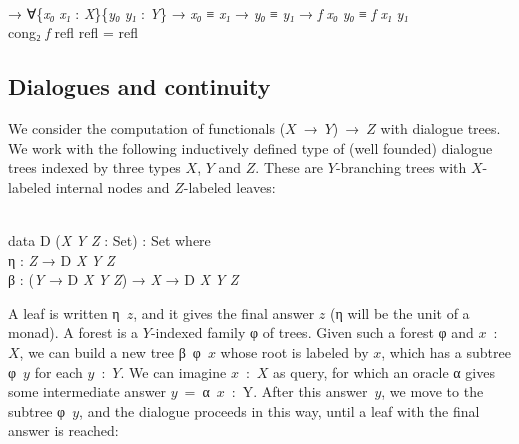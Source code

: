 \documentclass{entcs} \usepackage{prentcsmacro}
\newcommand{\AgdaC}[1]{\mbox{#1}}
\newcommand{\AgdaFontStyle}[1]{\textsf{#1}}
\newcommand{\AgdaBoundFontStyle}[1]{\textit{#1}}
\newcommand{\AgdaKeyword}     [1]
    {\AgdaFontStyle{\textcolor{AgdaKeyword}{#1}}}
\newcommand{\AgdaSymbol}      [1]{\textcolor{AgdaSymbol}{#1}}
\newcommand{\AgdaPrimitiveType}[1]
    {\AgdaFontStyle{\textcolor{AgdaPrimitiveType}{#1}}}
\newcommand{\AgdaBound}    [1]{\AgdaBoundFontStyle{\textcolor{AgdaBound}{#1}}}
\newcommand{\AgdaInductiveConstructor}[1]
    {\AgdaFontStyle{\textcolor{AgdaInductiveConstructor}{#1}}}
\newcommand{\AgdaDatatype} [1]{\AgdaFontStyle{\textcolor{AgdaDatatype}{#1}}}
\newcommand{\AgdaFunction} [1]{\AgdaFontStyle{\textcolor{AgdaFunction}{#1}}}
\newcommand{\AgdaIndent}[1]{\quad}
\newcommand{\AgdaCodeStyle}{\small}
\newenvironment{code}%
{\noindent\AgdaCodeStyle\pboxed}%
{\endpboxed\par\noindent%
\ignorespacesafterend}
\begin{document}
\begin{code}
\>[42]\<%
\\
\>[2]\AgdaIndent{6}{}\<[6]%
\>[6]\AgdaSymbol{→} \AgdaSymbol{∀\{}\AgdaBound{x₀} \AgdaBound{x₁} \AgdaSymbol{:} \AgdaBound{X}\AgdaSymbol{\}\{}\AgdaBound{y₀} \AgdaBound{y₁} \AgdaSymbol{:} \AgdaBound{Y}\AgdaSymbol{\}} \AgdaSymbol{→} \AgdaBound{x₀} \AgdaDatatype{≡} \AgdaBound{x₁} \AgdaSymbol{→} \AgdaBound{y₀} \AgdaDatatype{≡} \AgdaBound{y₁} \AgdaSymbol{→} \AgdaBound{f} \AgdaBound{x₀} \AgdaBound{y₀} \AgdaDatatype{≡} \AgdaBound{f} \AgdaBound{x₁} \AgdaBound{y₁}\<%
\\
\>\AgdaFunction{cong₂} \AgdaBound{f} \AgdaInductiveConstructor{refl} \AgdaInductiveConstructor{refl} \AgdaSymbol{=} \AgdaInductiveConstructor{refl}\<%
\\
\>\<\end{code}

\subsection{Dialogues and continuity} \label{section:dialogues:continuity}

We consider the computation of functionals \AgdaC{($X$ → $Y$) → $Z$}
with dialogue trees. We work with the following inductively defined
type of (well founded) dialogue trees indexed by three types $X$, $Y$
and $Z$. These are $Y$-branching trees with $X$-labeled internal nodes
and $Z$-labeled leaves:

\begin{code}\>\<%
\\
\>\AgdaKeyword{data} \AgdaDatatype{D} \AgdaSymbol{(}\AgdaBound{X} \AgdaBound{Y} \AgdaBound{Z} \AgdaSymbol{:} \AgdaPrimitiveType{Set}\AgdaSymbol{)} \AgdaSymbol{:} \AgdaPrimitiveType{Set} \AgdaKeyword{where} \<[33]%
\>[33]\<%
\\
\>[0]\AgdaIndent{2}{}\<[2]%
\>[2]\AgdaInductiveConstructor{η} \AgdaSymbol{:} \AgdaBound{Z} \AgdaSymbol{→} \AgdaDatatype{D} \AgdaBound{X} \AgdaBound{Y} \AgdaBound{Z}\<%
\\
\>[0]\AgdaIndent{2}{}\<[2]%
\>[2]\AgdaInductiveConstructor{β} \AgdaSymbol{:} \AgdaSymbol{(}\AgdaBound{Y} \AgdaSymbol{→} \AgdaDatatype{D} \AgdaBound{X} \AgdaBound{Y} \AgdaBound{Z}\AgdaSymbol{)} \AgdaSymbol{→} \AgdaBound{X} \AgdaSymbol{→} \AgdaDatatype{D} \AgdaBound{X} \AgdaBound{Y} \AgdaBound{Z}\<%
\\
\>\<\end{code}
A leaf is written \AgdaC{η $z$}, and it gives the final answer $z$ (η will
be the unit of a monad).  A forest is a $Y$-indexed family φ of
trees. Given such a forest \AgdaC{φ} and \AgdaC{$x$ : $X$}, we can build a
new tree \AgdaC{β φ $x$} whose root is labeled by $x$, which has a subtree
\AgdaC{φ $y$} for each \AgdaC{$y$ : $Y$}. We can imagine \AgdaC{$x$ : $X$} as
query, for which an oracle α gives some intermediate answer
\AgdaC{$y$ = α $x$ : Y}. After this answer~\AgdaC{$y$}, we move to the
subtree \AgdaC{φ $y$}, and the dialogue proceeds in this way, until a
leaf with the final answer is reached:
\end{document}
